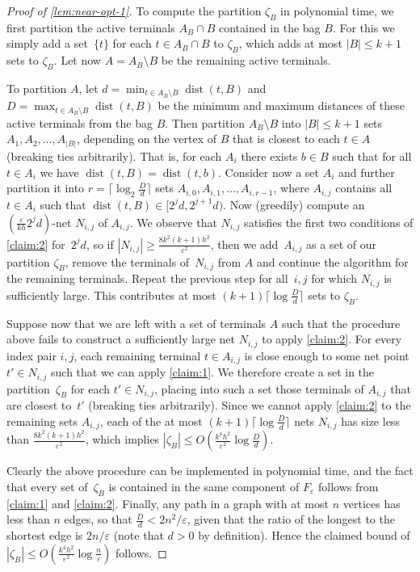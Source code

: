 \documentclass[a4paper]{article}
\theoremstyle{plain}
\newcommand{\eps}{{\varepsilon}}
\DeclareMathOperator{\dist}{dist}
\begin{document}
\begin{proof}[Proof of \autoref{lem:near-opt-1}]
To compute the partition $\zeta_B$ in polynomial time, we first partition the active terminals $A_B\cap B$ contained in the bag $B$. For this we simply add a set~$\{t\}$ for each $t\in A_B\cap B$ to $\zeta_B$, which adds at most $|B|\leq k+1$ sets to $\zeta_B$. Let now $A=A_B\setminus B$ be the remaining active terminals.

To partition $A$, let $d=\min_{t\in A_B\setminus B}\dist(t,B)$ and $D=\max_{t\in 
A_B\setminus B}\dist(t,B)$ be the minimum and maximum distances of these active 
terminals from the bag $B$. Then partition $A_B\setminus B$ into $|B|\le k+1$ 
sets $A_1, A_2,\ldots, A_{|B|}$, depending on the vertex of $B$ that is closest 
to each $t\in A$ (breaking ties arbitrarily). That is, for each $A_i$ there 
exists $b\in B$ such that for all $t\in A_i$ we have $\dist(t,B)=\dist(t,b)$. 
Consider now a set $A_i$ and further partition it into 
$r=\lceil\log_2\frac{D}{d}\rceil$ sets $A_{i,0}, A_{i,1},\ldots, A_{i,r-1}$, 
where $A_{i,j}$ contains all $t\in A_i$ such that $\dist(t,B)\in [2^jd, 
2^{j+1}d)$. Now (greedily) compute an $(\frac{\eps}{kh}2^jd)$-net $N_{i,j}$ of 
$A_{i,j}$. We observe that $N_{i,j}$ satisfies the first two conditions of 
\autoref{claim:2} for~$2^jd$, so if $|N_{i,j}|\ge \frac{8k^2(k+1)h^2}{\eps^2}$, 
then we add~$A_{i,j}$ as a set of our partition $\zeta_B$, remove the terminals 
of~$N_{i,j}$ from $A$ and continue the algorithm for the remaining terminals. 
Repeat the previous step for all~$i,j$ for which $N_{i,j}$ is sufficiently 
large. This contributes at most $(k+1)\lceil\log\frac{D}{d}\rceil$ sets to 
$\zeta_B$.

Suppose now that we are left with a set of terminals $A$ such that the procedure above fails to construct a sufficiently large net $N_{i,j}$ to apply \autoref{claim:2}. For every index pair $i,j$, each remaining terminal $t\in A_{i,j}$ is close enough to some net point $t'\in N_{i,j}$ such that we can apply \autoref{claim:1}. We therefore create a set in the partition~$\zeta_B$ for each $t'\in N_{i,j}$, placing into such a set those terminals of $A_{i,j}$ that are closest to~$t'$ (breaking ties arbitrarily). Since we cannot apply \autoref{claim:2} to the remaining sets $A_{i,j}$, each of the at most $(k+1)\lceil\log\frac{D}{d}\rceil$ nets $N_{i,j}$ has size less than $\frac{8k^2(k+1)h^2}{\eps^2}$, which implies $|\zeta_B|\leq O(\frac{k^4h^2}{\eps^2}\log\frac{D}{d})$.

Clearly the above procedure can be implemented in polynomial time, and the fact that every set of~$\zeta_B$ is contained in the same component of $F_\eps$ follows from \autoref{claim:1} and \autoref{claim:2}. Finally, any path in a graph with at most $n$ vertices has less than $n$ edges, so that $\frac{D}{d}<2n^2/\eps$, given that the ratio of the longest to the shortest edge is $2n/\eps$ (note that $d>0$ by definition). Hence the claimed bound of $|\zeta_B|\leq O(\frac{k^4h^2}{\eps^2}\log\frac{n}{\eps})$ follows.
\end{proof}
\end{document}
